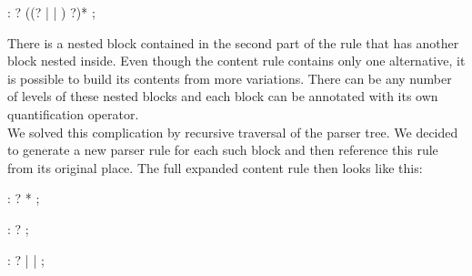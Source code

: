 \begin{antlr}
 :   ? ((? |  | ) ?)* ;
\end{antlr}

There is a nested block contained in the second part of the rule that has another block nested inside. Even though the content rule contains only one alternative, it is possible to build its contents from more variations. There can be any number of levels of these nested blocks and each block can be annotated with its own quantification operator. 
\\

We solved this complication by recursive traversal of the parser tree. We decided to generate a new parser rule for each such block and then reference this rule from its original place. The full expanded content rule then looks like this:

\begin{antlr}
 :   ? * ;

 :    ? ;

 :   ? 
        |    
        |   
        ;
\end{antlr}